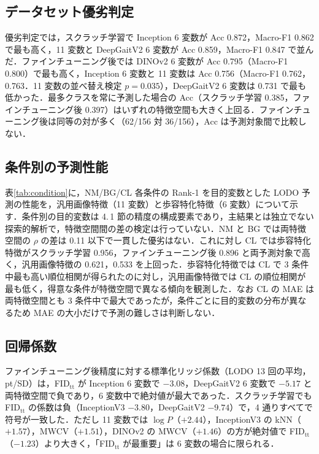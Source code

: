 \documentclass[technicalreport]{ieicej}
\begin{document}
\subsection{データセット優劣判定}
優劣判定では，スクラッチ学習で Inception 6 変数が Acc 0.872，Macro-F1 0.862 で最も高く，11 変数と DeepGaitV2 6 変数が Acc 0.859，Macro-F1 0.847 で並んだ．ファインチューニング後では DINOv2 6 変数が Acc 0.795（Macro-F1 0.800）で最も高く，Inception 6 変数と 11 変数は Acc 0.756（Macro-F1 0.762，0.763．11 変数の並べ替え検定 $p=0.035$），DeepGaitV2 6 変数は 0.731 で最も低かった．最多クラスを常に予測した場合の Acc（スクラッチ学習 0.385，ファインチューニング後 0.397）はいずれの特徴空間も大きく上回る．ファインチューニング後は同等の対が多く（62/156 対 36/156），Acc は予測対象間で比較しない．

\subsection{条件別の予測性能}
表\ref{tab:condition}に，NM/BG/CL 各条件の Rank-1 を目的変数とした LODO 予測の性能を，汎用画像特徴（11 変数）と歩容特化特徴（6 変数）について示す．条件別の目的変数は 4.\,1 節の精度の構成要素であり，主結果とは独立でない探索的解析で，特徴空間間の差の検定は行っていない．NM と BG では両特徴空間の $\rho$ の差は 0.11 以下で一貫した優劣はない．これに対し CL では歩容特化特徴がスクラッチ学習 0.956，ファインチューニング後 0.896 と両予測対象で高く，汎用画像特徴の 0.621，0.533 を上回った．歩容特化特徴では CL で 3 条件中最も高い順位相関が得られたのに対し，汎用画像特徴では CL の順位相関が最も低く，得意な条件が特徴空間で異なる傾向を観測した．なお CL の MAE は両特徴空間とも 3 条件中で最大であったが，条件ごとに目的変数の分布が異なるため MAE の大小だけで予測の難しさは判断しない．


\subsection{回帰係数}
ファインチューニング後精度に対する標準化リッジ係数（LODO 13 回の平均，pt/SD）は，FID$_{\mathrm{tt}}$ が Inception 6 変数で $-3.08$，DeepGaitV2 6 変数で $-5.17$ と両特徴空間で負であり，6 変数中で絶対値が最大であった．スクラッチ学習でも FID$_{\mathrm{tt}}$ の係数は負（InceptionV3 $-3.80$，DeepGaitV2 $-9.74$）で，4 通りすべてで符号が一致した．ただし 11 変数では $\log P$（$+2.44$），InceptionV3 の kNN（$+1.57$），MWCV（$+1.51$），DINOv2 の MWCV（$+1.46$）の方が絶対値で FID$_{\mathrm{tt}}$（$-1.23$）より大きく，「FID$_{\mathrm{tt}}$ が最重要」は 6 変数の場合に限られる．
\end{document}
